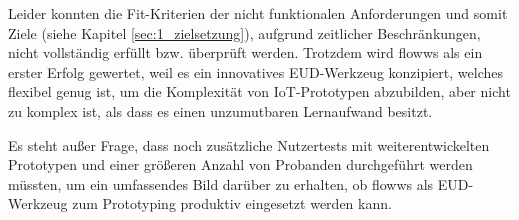 Leider konnten die Fit-Kriterien der nicht funktionalen Anforderungen und somit Ziele (siehe Kapitel \ref{sec:1_zielsetzung}), aufgrund zeitlicher Beschränkungen, nicht vollständig erfüllt bzw. überprüft werden. Trotzdem wird flowws als ein erster Erfolg gewertet, weil es ein innovatives \ac{EUD}-Werkzeug konzipiert, welches flexibel genug ist, um die Komplexität von \ac{IoT}-Prototypen abzubilden, aber nicht zu komplex ist, als dass es einen unzumutbaren Lernaufwand besitzt.  

Es steht außer Frage, dass noch zusätzliche Nutzertests mit weiterentwickelten Prototypen und einer größeren Anzahl von Probanden durchgeführt werden müssten, um ein umfassendes Bild darüber zu erhalten, ob flowws als \ac{EUD}-Werkzeug zum Prototyping produktiv eingesetzt werden kann.